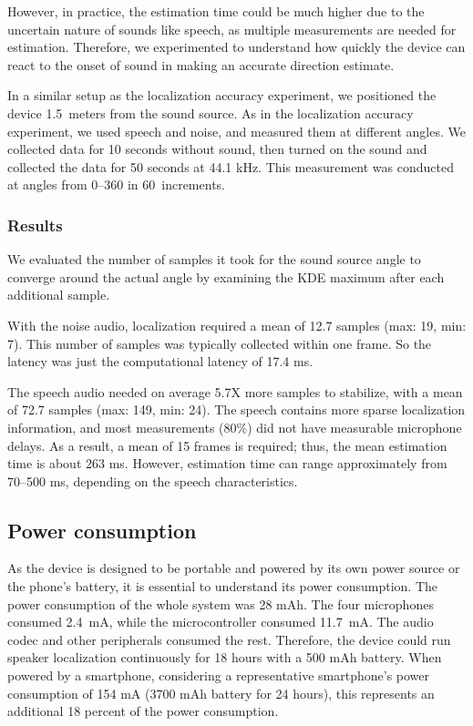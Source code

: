 However, in practice, the estimation time could be much higher due to the uncertain nature of sounds like speech, as multiple measurements are needed for estimation. 
Therefore, we experimented to understand how quickly the device can react to the onset of sound in making an accurate direction estimate.

In a similar setup as the localization accuracy experiment, we positioned the device 1.5~meters from the sound source. As in the localization accuracy experiment, we used speech and noise, and measured them at different angles. 
 We collected data for 10 seconds without sound, then turned on the sound and collected the data for 50 seconds at 44.1 kHz. This measurement was conducted at angles from 0--360 in 60\textdegree~increments. 

\subsubsection{Results} 
We evaluated the number of samples it took for the sound source angle to converge around the actual angle by examining the KDE maximum after each additional sample. %

With the noise audio, localization required a mean of 12.7 samples (max: 19, min: 7). This number of samples was typically collected within one frame. So the latency was just the computational latency of 17.4 ms.

The speech audio needed on average 5.7X more samples to stabilize, with a mean of 72.7 samples (max: 149, min: 24). The speech contains more sparse localization information, and most measurements (80\%) did not have measurable microphone delays. As a result, a mean of 15 frames is required; thus, the mean estimation time is about 263 ms. However, estimation time can range approximately from 70--500 ms, depending on the speech characteristics. 


\subsection{Power consumption} 
As the device is designed to be portable and powered by its own power source or the phone's battery, it is essential to understand its power consumption. The power consumption of the whole system was 28 mAh. The four microphones consumed 2.4~mA, while the microcontroller consumed 11.7~mA. The audio codec and other peripherals consumed the rest.
Therefore, the device could run speaker localization continuously for 18 hours with a 500 mAh battery. When powered by a smartphone, considering a representative smartphone's power consumption of 154 mA (3700 mAh battery for 24 hours), this represents an additional 18 percent of the power consumption. 

